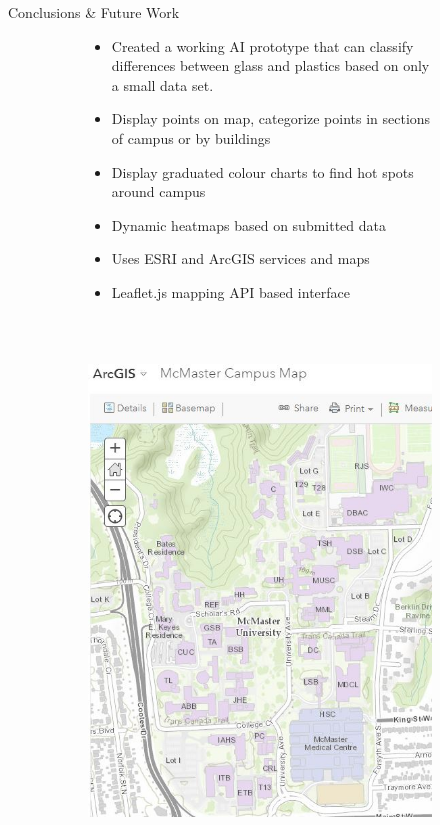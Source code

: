 \documentclass[22pt]{beamer}
\begin{document}
\begin{frame}[fragile]
\begin{textblock}{7.25}
\begin{block}{Conclusions \& Future Work}
\begin{figure}[htbp] %
\begin{subfigure}{0.45\textwidth}
\begin{itemize}
\item Created a working AI prototype that can classify differences between glass and plastics based on only a small data set.
\item Display points on map, categorize points in sections of campus or by buildings
\item Display graduated colour charts to find hot spots around campus
\item Dynamic heatmaps based on submitted data 
\item Uses ESRI and ArcGIS services and maps 
\item Leaflet.js mapping API based interface
\end{itemize}
\end{subfigure}
\begin{subfigure}{0.45\textwidth}
   \centering
   \includegraphics[height=14.5cm]{pinpointr-map.jpg}
   \label{fig:map}
\end{subfigure}
\end{figure}
\end{block}


\end{textblock}
\end{frame}
\end{document}
